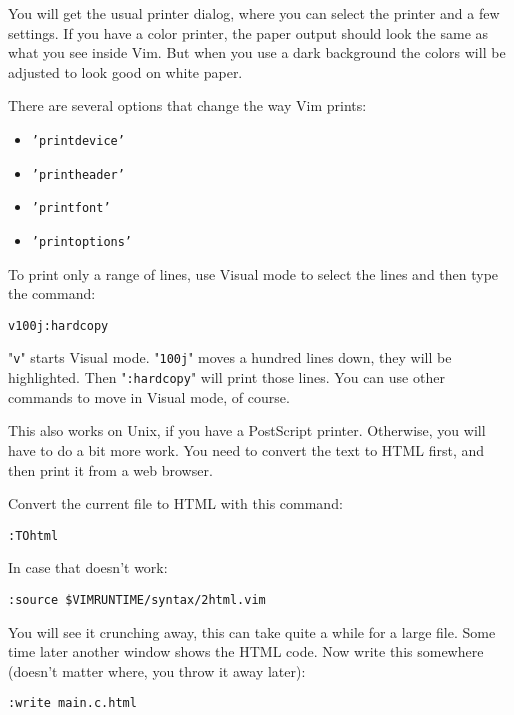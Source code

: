 You will get the usual printer dialog, where you can select the printer and a few settings.
If you have a color printer, the paper output should look the same as what you see inside Vim.
But when you use a dark background the colors will be adjusted to look good on white paper.

There are several options that change the way Vim prints:
\begin{itemize}
				\item \texttt{'printdevice'}
				\item \texttt{'printheader'}
				\item \texttt{'printfont'}
				\item \texttt{'printoptions'}
\end{itemize}

To print only a range of lines, use Visual mode to select the lines and then type the command:

 \begin{Verbatim}[samepage=true]
 v100j:hardcopy
 \end{Verbatim}

"\texttt{v}" starts Visual mode.
"\texttt{100j}" moves a hundred lines down, they will be highlighted.
Then "\texttt{:hardcopy}" will print those lines.
You can use other commands to move in Visual mode, of course.

This also works on Unix, if you have a PostScript printer.
Otherwise, you will have to do a bit more work.
You need to convert the text to HTML first, and then print it from a web browser.

Convert the current file to HTML with this command:

 \begin{Verbatim}[samepage=true]
 :TOhtml
 \end{Verbatim}

In case that doesn't work:

 \begin{Verbatim}[samepage=true]
 :source $VIMRUNTIME/syntax/2html.vim
 \end{Verbatim}

You will see it crunching away, this can take quite a while for a large file.
Some time later another window shows the HTML code.
Now write this somewhere (doesn't matter where, you throw it away later):

 \begin{Verbatim}[samepage=true]
 :write main.c.html
 \end{Verbatim}

